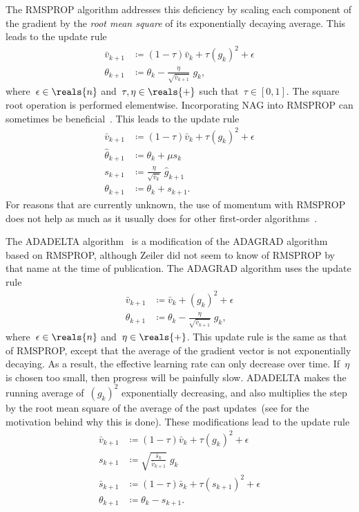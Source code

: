 \documentclass[11pt,a4paper]{article}
\numberwithin{equation}{section}
\begin{document}
The RMSPROP algorithm addresses this deficiency by scaling each component of the
gradient by the \emph{root mean square} of its exponentially decaying average.
This leads to the update rule
\begin{align*}
	\bar{v}_{k + 1} &\coloneqq (1 - \tau) \bar{v}_k + \tau (g_k)^2 + \epsilon \\
	\theta_{k + 1}  &\coloneqq \theta_k - \frac{\eta}{\sqrt{\bar{v}_{k + 1}}} \; g_k,
\end{align*}
where~$\epsilon \in \reals{n}$ and~$\tau, \eta \in \reals{+}$ such that~$\tau
\in [0, 1]$. The square root operation is performed elementwise. Incorporating
NAG into RMSPROP can sometimes be beneficial~\citep{hinton-nnml-2014,
climin-rmsprop}. This leads to the update rule
\begin{align*}
	\bar{v}_{k + 1}      &\coloneqq (1 - \tau) \bar{v}_k + \tau (g_k)^2 + \epsilon \\
	\hat{\theta}_{k + 1} &\coloneqq \theta_k + \mu s_k \\
	s_{k + 1}            &\coloneqq \frac{\eta}{\sqrt{\bar{v}_k}} \; \hat{g}_{k + 1} \\
	\theta_{k + 1}       &\coloneqq \theta_k + s_{k + 1}.
\end{align*}
For reasons that are currently unknown, the use of momentum with RMSPROP does
not help as much as it usually does for other first-order
algorithms~\citep{hinton-nnml-2014}.

The ADADELTA algorithm~\citep{zeiler2012adadelta} is a modification of the
ADAGRAD algorithm based on RMSPROP, although Zeiler did not seem to know of
RMSPROP by that name at the time of publication. The ADAGRAD algorithm uses the
update rule
\begin{align*}
	\bar{v}_{k + 1} &\coloneqq \bar{v}_k + (g_k)^2 + \epsilon \\
	\theta_{k + 1}  &\coloneqq \theta_k - \frac{\eta}{\sqrt{\bar{v}_{k + 1}}} \; g_k,
\end{align*}
where~$\epsilon \in \reals{n}$ and~$\eta \in \reals{+}$. This update rule is the
same as that of RMSPROP, except that the average of the gradient vector is not
exponentially decaying. As a result, the effective learning rate can only
decrease over time. If~$\eta$ is chosen too small, then progress will be
painfully slow.  ADADELTA makes the running average of~$(g_k)^2$ exponentially
decreasing, and also multiplies the step by the root mean square of the average
of the past updates~(see \citet{zeiler2012adadelta} for the motivation behind
why this is done). These modifications lead to the update rule
\begin{align*}
	\bar{v}_{k + 1} &\coloneqq (1 - \tau) \bar{v}_k + \tau (g_k)^2 + \epsilon \\
	s_{k + 1}       &\coloneqq \sqrt{\frac{\bar{s}_k}{\bar{v}_{k + 1}}} \; g_k \\
	\bar{s}_{k + 1} &\coloneqq (1 - \tau) \bar{s}_k + \tau (s_{k + 1})^2 + \epsilon \\
	\theta_{k + 1}  &\coloneqq \theta_k - s_{k + 1}.
\end{align*}
\end{document}
